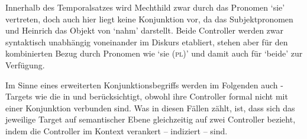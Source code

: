 Innerhalb des Temporalsatzes wird Mechthild zwar durch das Pronomen 
`sie' vertreten, doch auch hier liegt keine Konjunktion vor, da 
das Subjektpronomen und Heinrich das Objekt von  `nahm'
darstellt. Beide Controller werden zwar syntaktisch unabhängig voneinander im
Diskurs etabliert, stehen aber für den kombinierten Bezug durch Pronomen wie
 `sie (\textsc{pl})' und damit auch für 
`beide' zur Verfügung.

Im Sinne eines erweiterten Konjunktionsbegriffs werden im Folgenden auch
-Targets wie die in  und
 berücksichtigt, obwohl ihre Controller formal nicht mit
einer Konjunktion verbunden sind. Was in diesen Fällen zählt, ist, dass sich
das jeweilige Target auf semantischer Ebene gleichzeitig auf zwei Controller
bezieht, indem die Controller im Kontext verankert -- indiziert -- sind.

